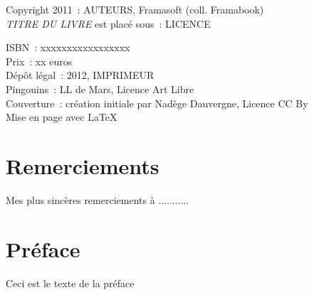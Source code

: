 \documentclass{framatexclass}
\begin{document}
\begin{titlepage}
\bigskip

\begin{small}
\noindent Copyright 2011~: AUTEURS, Framasoft (coll. Framabook)\\
\textit{TITRE DU LIVRE} est placé sous~: LICENCE

\noindent ISBN~: xxxxxxxxxxxxxxxxx \\
Prix~: xx euros \\
Dépôt légal~: 2012, IMPRIMEUR \\
Pingouins~: LL de Mars, Licence Art Libre \\
Couverture~: création initiale par Nadège Dauvergne, Licence CC By \\
Mise en page avec \LaTeX  \\
\end{small}



\end{titlepage}

                        
                        
                       
                        
%
\cleardoublepage
{}

\chapter*{Remerciements}
%

Mes plus sincères remerciements à ...........

                        
                        
%

\cleardoublepage
{}
\chapter*{Préface}
%

                    

Ceci est le texte de la préface



%
\cleardoublepage
{}
\end{document}
